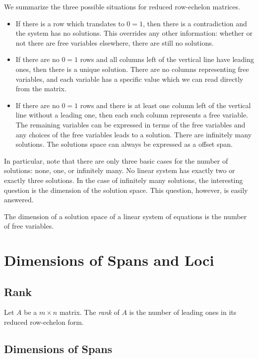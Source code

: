 \documentclass[fleqn]{report}
\begin{document}
We summarize the three possible situations for reduced
row-echelon matrices.
\begin{itemize}
\item If there is a row which translates to $0=1$, then there is
a contradiction and the system has no solutions. This overrides
any other information: whether or not there are free variables
elsewhere, there are still no solutions.
\item If there are no $0=1$ rows and all columns left of the
vertical line have leading ones, then there is a unique
solution. There are no columns representing free variables,
and each variable has a specific value which we can read
directly from the matrix. 
\item If there are no $0=1$ rows and there is at least one
column left of the vertical line without a leading one, then
each such column represents a free variable. The remaining
variables can be expressed in terms of the free variables and
any choices of the free variables leads to a solution. There
are infinitely many solutions. The solutions space can always
be expressed as a offset span.
\end{itemize}
In particular, note that there are only three basic cases for
the number of solutions: none, one, or infinitely many. No linear
system has exactly two or exactly three solutions. In the case
of infinitely many solutions, the interesting question is the
dimension of the solution space. This question, however, is
easily answered.

\begin{prop}
The dimension of a solution space of a linear system of
equations is the number of free variables.
\end{prop}

\chapter{Dimensions of Spans and Loci}
\label{dimensions}

\section{Rank} 

\begin{defn}
Let $A$ be a $m \times n$ matrix. The \emph{rank} of $A$ is the
number of leading ones in its reduced row-echelon form.
\end{defn}

\section{Dimensions of Spans}
\end{document}
